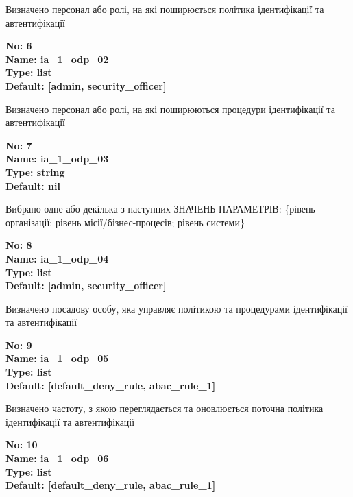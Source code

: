 \documentclass{article}
\begin{document}
{\footnotesize Визначено персонал або ролі, на які поширюється політика ідентифікації та автентифікації}


{\footnotesize\bfseries
No: 6\\
Name: ia\_\allowbreak{}1\_\allowbreak{}odp\_\allowbreak{}02\\
Type: list\\
Default: [\textquotedbl{}admin\textquotedbl{}, \textquotedbl{}security\_\allowbreak{}officer\textquotedbl{}]
}

{\footnotesize Визначено персонал або ролі, на які поширюються процедури ідентифікації та автентифікації}


{\footnotesize\bfseries
No: 7\\
Name: ia\_\allowbreak{}1\_\allowbreak{}odp\_\allowbreak{}03\\
Type: string\\
Default: nil
}

{\footnotesize Вибрано одне або декілька з наступних ЗНАЧЕНЬ ПАРАМЕТРІВ: \{рівень організації; рівень місії/бізнес-процесів; рівень системи\}}


{\footnotesize\bfseries
No: 8\\
Name: ia\_\allowbreak{}1\_\allowbreak{}odp\_\allowbreak{}04\\
Type: list\\
Default: [\textquotedbl{}admin\textquotedbl{}, \textquotedbl{}security\_\allowbreak{}officer\textquotedbl{}]
}

{\footnotesize Визначено посадову особу, яка управляє політикою та процедурами ідентифікації та автентифікації}


{\footnotesize\bfseries
No: 9\\
Name: ia\_\allowbreak{}1\_\allowbreak{}odp\_\allowbreak{}05\\
Type: list\\
Default: [\textquotedbl{}default\_\allowbreak{}deny\_\allowbreak{}rule\textquotedbl{}, \textquotedbl{}abac\_\allowbreak{}rule\_\allowbreak{}1\textquotedbl{}]
}

{\footnotesize Визначено частоту, з якою переглядається та оновлюється поточна політика ідентифікації та автентифікації}


{\footnotesize\bfseries
No: 10\\
Name: ia\_\allowbreak{}1\_\allowbreak{}odp\_\allowbreak{}06\\
Type: list\\
Default: [\textquotedbl{}default\_\allowbreak{}deny\_\allowbreak{}rule\textquotedbl{}, \textquotedbl{}abac\_\allowbreak{}rule\_\allowbreak{}1\textquotedbl{}]
}
\end{document}
